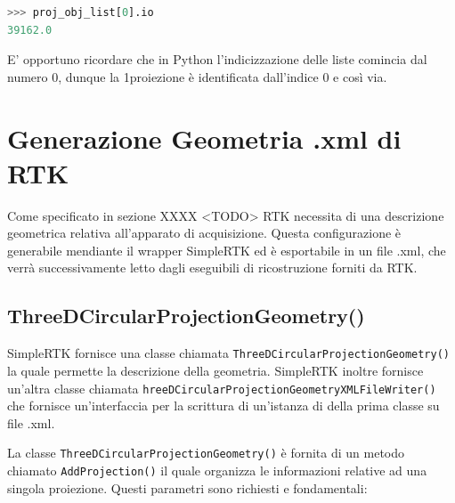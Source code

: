 \documentclass[a4paper,12pt, doubleside]{report}
\begin{document}
            \begin{lstlisting}[language=python, frame=bt]
>>> proj_obj_list[0].io
39162.0
            \end{lstlisting}
            
            E' opportuno ricordare che in Python l'indicizzazione delle liste comincia dal numero 0, dunque la 1\degree proiezione è identificata dall'indice 0 e così via.
            
        \section{Generazione Geometria .xml di RTK}
            \par
                Come specificato in sezione XXXX <TODO> RTK necessita di una descrizione geometrica relativa all'apparato di acquisizione. Questa configurazione è generabile mendiante il wrapper SimpleRTK ed è esportabile in un file .xml, che verrà successivamente letto dagli eseguibili di ricostruzione forniti da RTK.
                
            \subsection{ThreeDCircularProjectionGeometry()}
                \par
                    SimpleRTK fornisce una classe chiamata \texttt{ThreeDCircularProjectionGeometry()} la quale permette la descrizione della geometria. SimpleRTK inoltre fornisce un'altra classe chiamata \texttt{hreeDCircularProjectionGeometryXMLFileWriter()} che fornisce un'interfaccia per la scrittura di un'istanza di della prima classe su file .xml.
                
                    La classe \texttt{ThreeDCircularProjectionGeometry()} è fornita di un metodo chiamato \texttt{AddProjection()} il quale organizza le informazioni relative ad una singola proiezione.
                    Questi parametri sono richiesti e fondamentali:
                    
\end{document}
